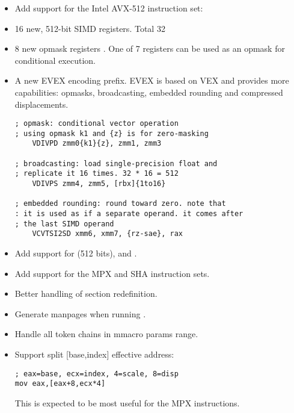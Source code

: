 \begin{itemize}
    \item{Add support for the Intel AVX-512 instruction set:}

    \item{16 new, 512-bit SIMD registers. Total 32 }

    \item{8 new opmask registers .
        One of 7 registers  can
        be used as an opmask for conditional execution.}

    \item{A new EVEX encoding prefix. EVEX is based on VEX and provides more
        capabilities: opmasks, broadcasting, embedded rounding and compressed
        displacements.
\begin{lstlisting}
; opmask: conditional vector operation
; using opmask k1 and {z} is for zero-masking
    VDIVPD zmm0{k1}{z}, zmm1, zmm3

; broadcasting: load single-precision float and
; replicate it 16 times. 32 * 16 = 512
    VDIVPS zmm4, zmm5, [rbx]{1to16}

; embedded rounding: round toward zero. note that
: it is used as if a separate operand. it comes after
; the last SIMD operand
    VCVTSI2SD xmm6, xmm7, {rz-sae}, rax
\end{lstlisting}}

    \item{Add support for  (512 bits),  and .}

    \item{Add support for the MPX and SHA instruction sets.}

    \item{Better handling of section redefinition.}

    \item{Generate manpages when running .}

    \item{Handle all token chains in mmacro params range.}

    \item{Support split [base,index] effective address:
\begin{lstlisting}
; eax=base, ecx=index, 4=scale, 8=disp
mov eax,[eax+8,ecx*4]
\end{lstlisting}
        This is expected to be most useful for the MPX instructions.}


\end{itemize}
